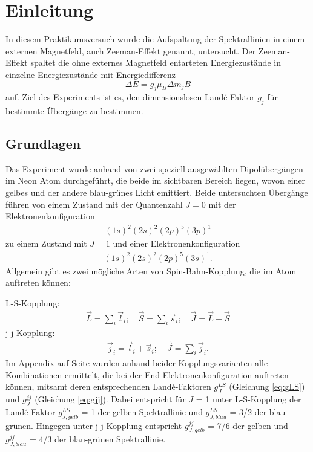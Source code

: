 \documentclass[a4paper,parskip,11pt, DIV12]{scrreprt}
\begin{document}
	
	\tableofcontents
	
		\chapter{Einleitung}
	
	In diesem Praktikumsversuch wurde die Aufspaltung der Spektrallinien in einem externen Magnetfeld, auch Zeeman-Effekt genannt, untersucht. Der Zeeman-Effekt spaltet die ohne externes Magnetfeld entarteten Energiezustände in einzelne Energiezustände mit Energiedifferenz
	\begin{equation}
	\label{Energiedifferenz}
	\Delta E = g_j \mu_B \Delta m_j B 
	\end{equation}
auf. Ziel des Experiments ist es, den dimensionslosen Landé-Faktor $g_j $ für bestimmte Übergänge zu bestimmen. 
	\section{Grundlagen}
	\label{sec:Grundlagen}
	Das Experiment wurde anhand von zwei speziell ausgewählten Dipolübergängen im Neon Atom durchgeführt, die beide im sichtbaren Bereich liegen, wovon einer gelbes und der andere blau-grünes Licht emittiert. Beide untersuchten Übergänge führen von einem Zustand mit der Quantenzahl $ J = 0 $ mit der Elektronenkonfiguration\begin{align*}
		(1s)^2(2s)^2(2p)^5(3p)^1	\end{align*}zu einem Zustand mit $J = 1$ und einer Elektronenkonfiguration \begin{align*}
		(1s)^2(2s)^2(2p)^5(3s)^1.
		\end{align*} 
		Allgemein gibt es zwei mögliche Arten von Spin-Bahn-Kopplung, die im Atom auftreten können: 
		
		L-S-Kopplung: \begin{align*}
		\vec{L} = \sum_i \vec{l}_i ; \quad \vec{S} = \sum_i \vec{s}_i ; \quad \vec{J} = \vec{L} + \vec{S}
		\end{align*}
		j-j-Kopplung: \begin{align*}
		\vec{j}_i = \vec{l}_i + \vec{s}_i ; \quad \vec{J} = \sum_i \vec{j}_i.
		\end{align*}
		Im Appendix auf Seite \pageref{ch:Appendix} wurden anhand beider Kopplungsvarianten alle Kombinationen ermittelt, die bei der End-Elektronenkonfiguration auftreten können, mitsamt deren entsprechenden Landé-Faktoren $g_J^{LS}$ (Gleichung \ref{eq:gLS}) und $g_J^{jj}$ (Gleichung \ref{eq:gjj}). Dabei entspricht für $J$ = 1 unter L-S-Kopplung der Landé-Faktor $g_{J,gelb}^{LS}$ = 1 der gelben Spektrallinie und $g_{J,blau}^{LS}$ = 3/2 der blau-grünen. Hingegen unter j-j-Kopplung entspricht $g_{J,gelb}^{jj}$ = 7/6 der gelben und $g_{J,blau}^{jj}$ = 4/3 der blau-grünen Spektrallinie.
		
\end{document}
